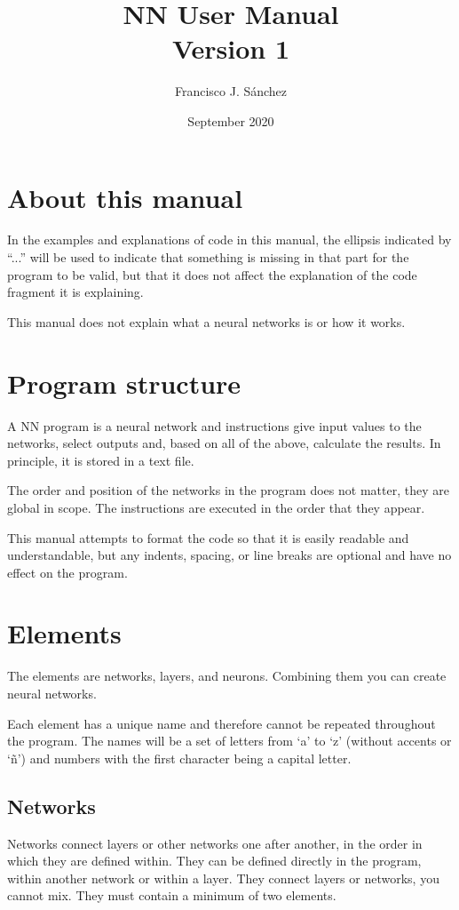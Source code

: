 \documentclass[a4paper]{article}
\title{NN User Manual\\
\large Version 1}
\author{Francisco J. Sánchez}
\date{September 2020}
\begin{document}
\maketitle

\tableofcontents

\section*{About this manual}
In the examples and explanations of code in this manual, the ellipsis indicated by ``...'' will be used to indicate that something is missing in that part for the program to be valid, but that it does not affect the explanation of the code fragment it is explaining.

This manual does not explain what a neural networks is or how it works.

\section{Program structure}
A NN program is a neural network and instructions give input values   to the networks, select outputs and, based on all of the above, calculate the results. In principle, it is stored in a text file.

The order and position of the networks in the program does not matter, they are global in scope. The instructions are executed in the order that they appear.

This manual attempts to format the code so that it is easily readable and understandable, but any indents, spacing, or line breaks are optional and have no effect on the program.

\section{Elements}
The elements are networks, layers, and neurons. Combining them you can create neural networks.

Each element has a unique name and therefore cannot be repeated throughout the program. The names will be a set of letters from `a' to `z' (without accents or `ñ') and numbers with the first character being a capital letter. \label{nombres}

\subsection{Networks}
Networks connect layers or other networks one after another, in the order in which they are defined within. They can be defined directly in the program, within another network or within a layer. They connect layers or networks, you cannot mix. They must contain a minimum of two elements.
\end{document}

